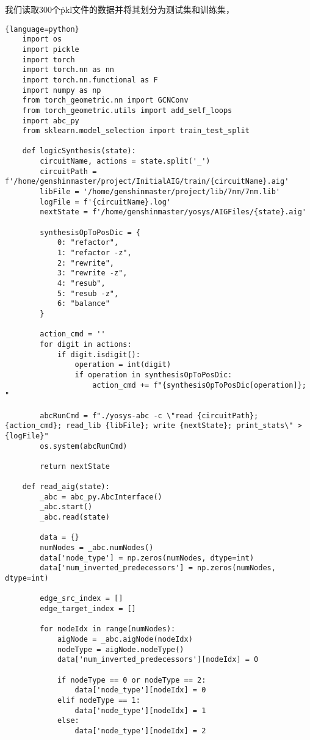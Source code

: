 \documentclass[UTF8]{ctexart}
\begin{document}
我们读取300个\.pkl文件的数据并将其划分为测试集和训练集，
\begin{lstlisting}{language=python}
    import os
    import pickle
    import torch
    import torch.nn as nn
    import torch.nn.functional as F
    import numpy as np
    from torch_geometric.nn import GCNConv
    from torch_geometric.utils import add_self_loops
    import abc_py
    from sklearn.model_selection import train_test_split
    
    def logicSynthesis(state):
        circuitName, actions = state.split('_')
        circuitPath = f'/home/genshinmaster/project/InitialAIG/train/{circuitName}.aig'
        libFile = '/home/genshinmaster/project/lib/7nm/7nm.lib'
        logFile = f'{circuitName}.log'
        nextState = f'/home/genshinmaster/yosys/AIGFiles/{state}.aig'
    
        synthesisOpToPosDic = {
            0: "refactor",
            1: "refactor -z",
            2: "rewrite",
            3: "rewrite -z",
            4: "resub",
            5: "resub -z",
            6: "balance"
        }
    
        action_cmd = ''
        for digit in actions:
            if digit.isdigit():
                operation = int(digit)
                if operation in synthesisOpToPosDic:
                    action_cmd += f"{synthesisOpToPosDic[operation]}; "
    
        abcRunCmd = f"./yosys-abc -c \"read {circuitPath}; {action_cmd}; read_lib {libFile}; write {nextState}; print_stats\" > {logFile}"
        os.system(abcRunCmd)
    
        return nextState
    
    def read_aig(state):
        _abc = abc_py.AbcInterface()
        _abc.start()
        _abc.read(state)
    
        data = {}
        numNodes = _abc.numNodes()
        data['node_type'] = np.zeros(numNodes, dtype=int)
        data['num_inverted_predecessors'] = np.zeros(numNodes, dtype=int)
    
        edge_src_index = []
        edge_target_index = []
    
        for nodeIdx in range(numNodes):
            aigNode = _abc.aigNode(nodeIdx)
            nodeType = aigNode.nodeType()
            data['num_inverted_predecessors'][nodeIdx] = 0
    
            if nodeType == 0 or nodeType == 2:
                data['node_type'][nodeIdx] = 0
            elif nodeType == 1:
                data['node_type'][nodeIdx] = 1
            else:
                data['node_type'][nodeIdx] = 2
    

\end{lstlisting}
\end{document}
